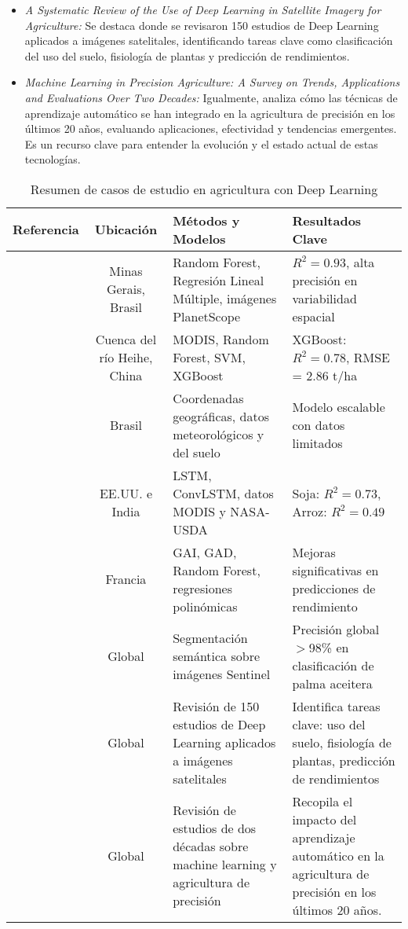 \begin{itemize}
    \item \textit{A Systematic Review of the Use of Deep Learning in Satellite Imagery for Agriculture:} Se destaca \cite{victor2022} donde se revisaron 150 estudios de Deep Learning aplicados a imágenes satelitales, identificando tareas clave como clasificación del uso del suelo, fisiología de plantas y predicción de rendimientos.
    
    \item \textit{Machine Learning in Precision Agriculture: A Survey on Trends, Applications and Evaluations Over Two Decades:} Igualmente, \cite{condran2022} analiza cómo las técnicas de aprendizaje automático se han integrado en la agricultura de precisión en los últimos 20 años, evaluando aplicaciones, efectividad y tendencias emergentes. Es un recurso clave para entender la evolución y el estado actual de estas tecnologías.

\end{itemize}

\begin{table*}[t]
        \centering
        \caption{Resumen de casos de estudio en agricultura con Deep Learning}\label{tab:case_studies}
        \begin{tabular}{c c p{4.5cm} p{5.25cm}}
            \toprule
            \textbf{Referencia} & \textbf{Ubicación} & \textbf{Métodos y Modelos} & \textbf{Resultados Clave} \\ 
            \midrule
            \cite{martello2022} & Minas Gerais, Brasil & Random Forest, Regresión Lineal Múltiple, imágenes PlanetScope & $R^2 = 0.93$, alta precisión en variabilidad espacial \\ 
            \cite{geng2021} & Cuenca del río Heihe, China & MODIS, Random Forest, SVM, XGBoost & XGBoost: $R^2 = 0.78$, RMSE = 2.86 t/ha \\ 
            \cite{cunha2020} & Brasil & Coordenadas geográficas, datos meteorológicos y del suelo & Modelo escalable con datos limitados \\ 
            \cite{divakar2022} & EE.UU. e India & LSTM, ConvLSTM, datos MODIS y NASA-USDA & Soja: $R^2 = 0.73$, Arroz: $R^2 = 0.49$ \\ 
            \cite{debaeke2023} & Francia & GAI, GAD, Random Forest, regresiones polinómicas & Mejoras significativas en predicciones de rendimiento \\ 
            \cite{descals2021} & Global & Segmentación semántica sobre imágenes Sentinel & Precisión global $>$98\% en clasificación de palma aceitera \\ 
            \cite{victor2022} & Global & Revisión de 150 estudios de Deep Learning aplicados a imágenes satelitales & Identifica tareas clave: uso del suelo, fisiología de plantas, predicción de rendimientos \\ 
            \cite{condran2022} & Global & Revisión de estudios de dos décadas sobre machine learning y agricultura de precisión & Recopila el impacto del aprendizaje automático en la agricultura de precisión en los últimos 20 años. \\ 
            \bottomrule
        \end{tabular}
\end{table*}

